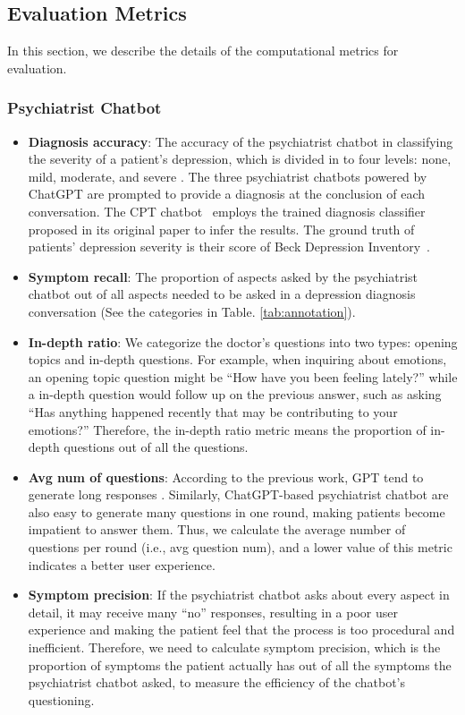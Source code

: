 \subsection{Evaluation Metrics}
\label{apd:eval}
In this section, we describe the details of the computational metrics for evaluation.
\subsubsection{Psychiatrist Chatbot}
\begin{itemize}
    \item \textbf{Diagnosis accuracy}: The accuracy of the psychiatrist chatbot in classifying the severity of a patient's depression, which is divided in to four levels: none, mild, moderate, and severe \cite{beck1996beck}. The three psychiatrist chatbots powered by ChatGPT are prompted to provide a diagnosis at the conclusion of each conversation. The CPT chatbot~\cite{yao-etal-2022-d4} employs the trained diagnosis classifier proposed in its original paper to infer the results. The ground truth of patients' depression severity is their score of Beck Depression Inventory~\cite{beck1996beck}.
    \item \textbf{Symptom recall}: The proportion of aspects asked by the psychiatrist chatbot out of all aspects needed to be asked in a depression diagnosis conversation (See the categories in Table. \ref{tab:annotation}).
\end{itemize}

\begin{itemize}
    \item \textbf{In-depth ratio}: We categorize the doctor's questions into two types: opening topics and in-depth questions. For example, when inquiring about emotions, an opening topic question might be ``How have you been feeling lately?'' while a in-depth question would follow up on the previous answer, such as asking ``Has anything happened recently that may be contributing to your emotions?'' Therefore, the in-depth ratio metric means the proportion of in-depth questions out of all the questions.
    \item \textbf{Avg num of questions}: According to the previous work, GPT tend to generate long responses \cite{wei2023leveraging}. Similarly, ChatGPT-based psychiatrist chatbot are also easy to generate many questions in one round, making patients become impatient to answer them. Thus, we calculate the average number of questions per round (i.e., avg question num), and a lower value of this metric indicates a better user experience.
    \item \textbf{Symptom precision}: If the psychiatrist chatbot asks about every aspect in detail, it may receive many ``no'' responses, resulting in a poor user experience and making the patient feel that the process is too procedural and inefficient. Therefore, we need to calculate symptom precision, which is the proportion of symptoms the patient actually has out of all the symptoms the psychiatrist chatbot asked, to measure the efficiency of the chatbot's questioning.
\end{itemize}

